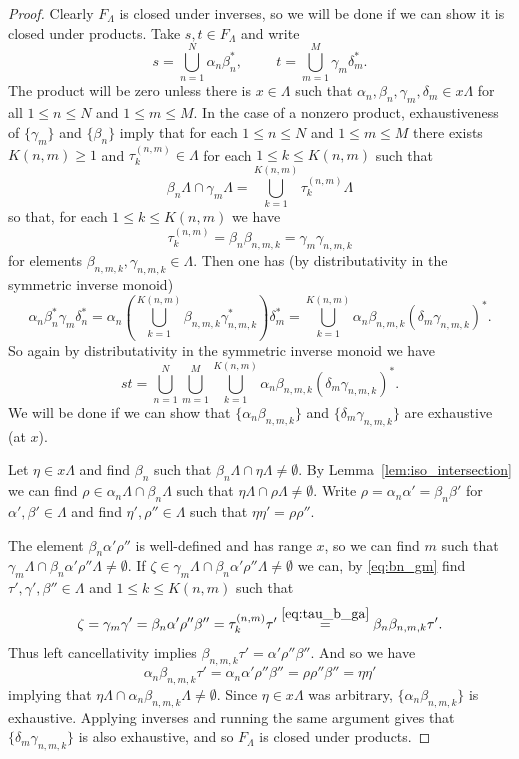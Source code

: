 \documentclass[12pt]{amsart}
\theoremstyle{definition}
\theoremstyle{remark}
\numberwithin{equation}{section}
\renewcommand{\L}{\Lambda}
\renewcommand{\a}{\alpha}
\renewcommand{\b}{\beta}
\newcommand{\ga}{\gamma}
\newcommand{\de}{\delta}
\begin{document}
	\begin{proof}
		Clearly $F_\L$ is closed under inverses, so we will be done if we can show it is closed under products. Take $s,t\in F_\L$ and write
		\[
		s = \bigcup_{n=1}^N \a_n\b_n^*, \hspace{1cm} t = \bigcup_{m=1}^M \ga_m\de_m^*.
		\]
		The product will be zero unless there is $x\in \L$ such that $\a_n, \b_n, \ga_m, \de_m\in x\L$ for all $1\leq n\leq N$ and $1\leq m\leq M$. In the case of a nonzero product, exhaustiveness of $\{\ga_m\}$ and $\{\b_n\}$ imply that for each $1\leq n\leq N$ and $1\leq m\leq M$ there exists $K(n,m)\geq 1$ and $\tau_k^{(n,m)}\in \Lambda$ for each $1\leq k\leq K(n,m)$ such that
		\begin{equation}\label{eq:bn_gm}
		\b_n \L \cap \ga_m\L = \bigcup_{k=1}^{K(n,m)} \tau_k^{(n,m)}\L
		\end{equation}
		so that, for each  $1\leq k\leq K(n,m)$ we have
		\begin{equation}\label{eq:tau_b_ga}
		\tau_k^{(n,m)} = \b_n\b_{n,m,k} = \ga_m\ga_{n,m,k}
		\end{equation}
		for elements $\b_{n,m,k}, \ga_{n,m,k}\in \L$. Then one has (by distributativity in the symmetric inverse monoid)
		\[
		\a_n\b_n^*\ga_m\de^*_n = \a_n\left(\bigcup_{k=1}^{K(n,m)}\b_{n,m,k}\ga_{n,m,k}^*\right)\de_m^* = \bigcup_{k=1}^{K(n,m)}\a_n\b_{n,m,k}(\de_m\ga_{n,m,k})^* .
		\]
		So again by distributativity in the symmetric inverse monoid we have
		\[
		st = \bigcup_{n=1}^N\bigcup_{m=1}^M\bigcup_{k=1}^{K(n,m)}\a_n\b_{n,m,k}(\de_m\ga_{n,m,k})^*.
		\]
		We will be done if we can show that $\{\a_n\b_{n,m,k}\}$ and $\{\de_m\ga_{n,m,k}\}$ are exhaustive (at $x$).
		
		Let $\eta\in x\L$ and find $\b_n$ such that $\b_n\L\cap \eta\L\neq\emptyset$. By Lemma~\ref{lem:iso_intersection} we can find $\rho\in \a_n\L\cap\b_n\L$ such that $\eta\L\cap \rho\L\neq \emptyset$. Write $\rho = \a_n\a' = \b_n\b'$ for $\a',\b'\in\Lambda$ and find $\eta', \rho''\in\Lambda$ such that $\eta\eta' = \rho\rho''$. 
		
		The element $\b_n\alpha'\rho''$ is well-defined and has range $x$, so we can find $m$ such that $\ga_m\L\cap \b_n\alpha'\rho''\L\neq\emptyset$. If $\zeta\in \ga_m\L\cap \b_n\alpha'\rho''\L\neq\emptyset$ we can, by \eqref{eq:bn_gm} find $\tau', \ga',\b''\in\L$ and $1\leq k\leq K(n,m)$ such that
		\[
		\zeta = \ga_m\ga' = \b_n\alpha'\rho''\b'' = \tau_k^{(n,m)}\tau' \stackrel{\eqref{eq:tau_b_ga}}{=} \b_n\b_{n,m,k}\tau'.
		\]
		Thus left cancellativity implies $\b_{n,m,k}\tau' = \alpha'\rho''\b''$. And so we have
		\[
		\a_n\b_{n,m,k}\tau' = \a_n\alpha'\rho''\b'' = \rho\rho''\b'' = \eta\eta'
		\]
		implying that $\eta\Lambda\cap \a_n\b_{n,m,k}\Lambda\neq\emptyset$. Since $\eta\in x\L$ was arbitrary, $\{\a_n\b_{n,m,k}\}$ is exhaustive. Applying inverses and running the same argument gives that $\{\de_m\ga_{n,m,k}\}$ is also exhaustive, and so $F_\L$ is closed under products.
	\end{proof}
	
\end{document}
